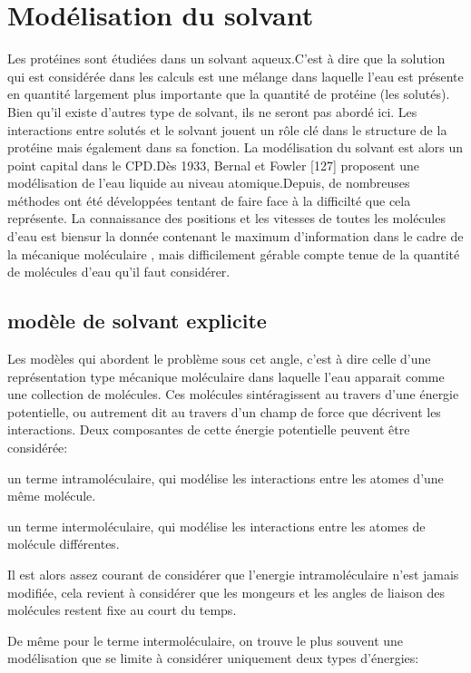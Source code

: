 \section{Modélisation du solvant}
Les protéines sont étudiées dans un solvant aqueux.C'est à dire que la solution qui est considérée dans les calculs est une mélange dans laquelle l'eau est présente en quantité largement plus importante que la quantité de protéine (les solutés). Bien qu'il existe d'autres type de solvant, ils ne seront pas abordé ici. Les interactions entre solutés et le solvant jouent un  rôle clé dans le structure de la protéine mais également dans sa fonction. La modélisation du solvant est alors un point capital dans le CPD.Dès 1933, Bernal et Fowler [127] proposent une modélisation de l'eau liquide au niveau atomique.Depuis, de nombreuses méthodes ont été développées tentant de faire face à la difficilté que cela représente. La connaissance des positions et les vitesses de toutes les molécules d'eau est biensur la donnée contenant le maximum d'information dans le cadre de la mécanique moléculaire , mais difficilement gérable compte tenue de la quantité de molécules d'eau qu'il faut considérer.

\subsection{modèle de solvant explicite}

Les modèles qui abordent le problème sous cet angle, c'est à dire celle d'une représentation type mécanique moléculaire dans laquelle l'eau apparait comme une collection de molécules. Ces molécules sintéragissent au travers d'une énergie potentielle, ou autrement dit au travers d'un champ de force que décrivent les interactions.
Deux composantes de cette énergie potentielle peuvent être considérée:
\begin{enumeration}
\item un terme intramoléculaire, qui modélise les interactions entre les atomes d'une même molécule.
\item un terme intermoléculaire, qui modélise les interactions entre les atomes de molécule différentes.
\end{enumeration}

Il est alors assez courant de considérer que l'energie intramoléculaire n'est jamais modifiée, cela revient à considérer que les mongeurs et les angles de liaison des molécules restent fixe au court du temps.

De même pour le terme intermoléculaire, on trouve le plus souvent une modélisation que se limite à considérer uniquement deux types d'énergies:

